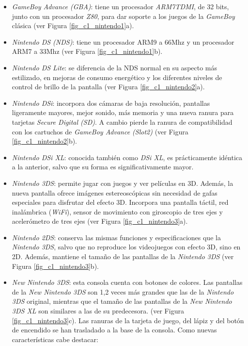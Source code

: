 \begin{itemize}
\item \textit{GameBoy Advance (GBA)}: tiene un procesador \textit{ARM7TDMI}, de 32 	bits, junto con un procesador \textit{Z80}, para dar soporte a los juegos de la \textit{GameBoy} clásica (ver Figura \ref{fig_c1_nintendo1}a). 
%
\item \textit{Nintendo DS (NDS)}: tiene un procesador ARM9 a 66Mhz y un procesador ARM7 a 33Mhz (ver Figura \ref{fig_c1_nintendo1}b).
%	
\item \textit{Nintendo DS Lite}: se diferencia de la NDS normal en su aspecto más estilizado, en mejoras de consumo energético y los diferentes niveles de control de brillo de la pantalla (ver Figura \ref{fig_c1_nintendo2}a). 
%	
\item \textit{Nintendo DSi}: incorpora dos cámaras de baja resolución, pantallas ligeramente mayores, mejor sonido, más memoria y una nueva ranura para tarjetas \textit{Secure Digital (SD)}. A cambio pierde la ranura de compa\-ti\-bilidad con los cartuchos de \textit{GameBoy	Advance (Slot2)} (ver Figura \ref{fig_c1_nintendo2}b).
%
\item \textit{Nintendo DSi XL}: conocida también como \textit{DSi XL}, es prácticamente idéntica a la anterior, salvo que su forma es significativamente mayor. 
%
\item \textit{Nintendo 3DS}: permite jugar con juegos y ver películas en 3D. Además, la nueva pantalla ofrece imágenes estereoscópicas sin necesidad de gafas especiales para disfrutar del efecto 3D. Incorpora una pantalla táctil, red inalámbrica (\textit{WiFi}), sensor de movimiento con giroscopio de tres ejes y acelerómetro de tres ejes (ver Figura \ref{fig_c1_nintendo3}a).
%
\item \textit{Nintendo 2DS}: conserva las mismas funciones y especificaciones que la \textit{Nintendo 3DS}, salvo que no reproduce los videojuegos con efecto 3D, sino en 2D. Además, mantiene el tamaño de las pantallas de la \textit{Nintendo 3DS} (ver Figura \ref{fig_c1_nintendo3}b).
%	
\item \textit{New Nintendo 3DS}: esta consola cuenta con botones de colores.  Las pantallas de la \textit{New Nintendo 3DS} son 1,2 veces más grandes que las de la \textit{Nintendo 3DS} original, mientras que el tamaño de las pantallas de la \textit{New Nintendo 3DS XL} son similares a las de su predecesora. (ver Figura \ref{fig_c1_nintendo3}c). Las ranuras de la tarjeta de juego, del lápiz y del botón de encendido se han trasladado a la base de la consola. Como nuevas características cabe destacar:

\end{itemize}
